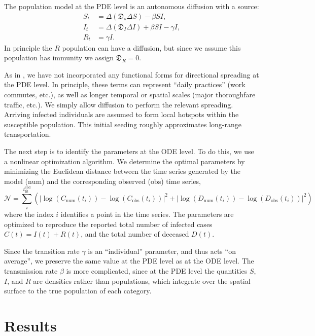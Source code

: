 \documentclass[11pt]{article}
\newcommand{\N}{\mathcal{N}}
\newcommand{\num}{\text{num}}
\newcommand{\obs}{\text{obs}}
\newcommand{\D}{\mathfrak{D}}
\begin{document}
The population model at the PDE level is an autonomous diffusion with a source:
\begin{align}
	S_t	&=	\Delta (\D_s \Delta S) - \beta SI,	\\
	I_t	&=	\Delta (\D_I \Delta I) + \beta SI - \gamma I,	\\
	R_t	&=	\gamma I.
\end{align}
In principle the $R$ population can have a diffusion, but since we assume this population has immunity we assign $\D_R = 0$.

As in \cite{Kevrekidis_2021}, we have not incorporated any functional forms for directional spreading at the PDE level.
In principle, these terms can represent ``daily practices'' (work commutes, etc.), as well as longer temporal or spatial scales (major thoroughfare traffic, etc.).
We simply allow diffusion to perform the relevant spreading.
Arriving infected individuals are assumed to form local hotspots within the susceptible population.
This initial seeding roughly approximates long-range transportation.

The next step is to identify the parameters at the ODE level.
To do this, we use a nonlinear optimization algorithm.
We determine the optimal parameters by minimizing the Euclidean distance between the time series generated by the model ($\num$) and the corresponding observed ($\obs$) time series,
\begin{equation} \label{eq:obj}
	\N = \sum_i^{t_\text{fit}^\text{end}} \left( \left| \log(C_\num (t_i)) - \log(C_\obs (t_i)) \right|^2 + \left| \log(D_\num (t_i)) - \log(D_\obs (t_i)) \right|^2 \right)
\end{equation}
where the index $i$ identifies a point in the time series.
The parameters are optimized to reproduce the reported total number of infected cases $C(t) = I(t) + R(t)$, and the total number of deceased $D(t)$.

Since the transition rate $\gamma$ is an ``individual'' parameter, and thus acts ``on average'', we preserve the same value at the PDE level as at the ODE level.
The transmission rate $\beta$ is more complicated, since at the PDE level the quantities $S$, $I$, and $R$ are densities rather than populations,
which integrate over the spatial surface to the true population of each category.

\section{Results}
\end{document}
